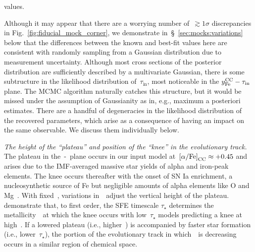 \documentclass[ms.tex]{subfiles}
\begin{document}
values.
\par
Although it may appear that there are a worrying number of~$\gtrsim 1\sigma$
discrepancies in Fig.~\ref{fig:fiducial_mock_corner}, we demonstrate
in~\S~\ref{sec:mocks:variations} below that the differences between the known
and best-fit values here are consistent with randomly sampling from a Gaussian
distribution due to measurement uncertainty.
Although most cross sections of the posterior distribution are sufficiently
described by a multivariate Gaussian, there is some subtructure in the
likelihood distribution of~$\tau_\text{in}$, most noticeable in the
$y_\text{Fe}^\text{CC} - \tau_\text{in}$ plane.
The MCMC algorithm naturally catches this structure, but it would be missed
under the assumption of Gaussianity as in, e.g., maximum a posteriori estimates.
There are a handful of degeneracies in the likelihood distribution of the
recovered parameters, which arise as a consequence of having an impact on the
same observable.
We discuss them individually below.
\par
\textit{The height of the ``plateau'' and position of the ``knee'' in the
evolutionary track.}
The plateau in the~\afe-\feh~plane occurs in our input model
at~$\text{[$\alpha$/Fe]}_\text{CC} \approx +0.45$ and arises due to the IMF-averaged massive
star yields of alpha and iron-peak elements.
The knee occurs thereafter with the onset of SN Ia enrichment, a
nucleosynthetic source of Fe but negligible amounts of alpha elements like O
and Mg~\citep{Johnson2019}.
With fixed~\yacc, variations in~\yfecc~adjust the vertical height of the
plateau.
\citet{Weinberg2017} demonstrate that, to first order, the SFE timescale
$\tau_\star$ determines the metallicity~\feh~at which the knee occurs with
low~$\tau_\star$ models predicting a knee at high~\feh.
If a lowered plateau (i.e., higher~\yfecc) is accompanied by faster star
formation (i.e., lower~$\tau_\star$), the portion of the evolutionary track
in which~\afe~is decreasing occurs in a similar region of chemical space.
\end{document}

